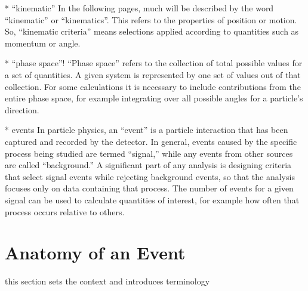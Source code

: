    * ``kinematic'' 
In the following pages, much will be described by the word 
``kinematic'' or ``kinematics''.  
This refers to the properties of position or motion.  
So, ``kinematic criteria'' means selections applied according to 
quantities such as momentum or angle.  




   * ``phase space''! 
``Phase space'' refers to the collection of total 
possible values for a set of quantities.  
A given system is represented by one set of 
values out of that collection.  
For some calculations it is necessary to include 
contributions from the entire phase space, 
for example integrating over all possible 
angles for a particle's direction.  

   * events
In particle physics, an ``event'' is a particle interaction 
that has been captured and recorded by the detector.  
In general, %
events caused by the specific process     
being studied are termed ``signal,'' 
while any events 
from other sources 
are called ``background.'' 
A significant part of any analysis is designing 
criteria that select signal events while 
rejecting background events, 
so that the analysis focuses only on data containing 
that process.  
The number of events for a given signal can be used 
to calculate quantities of interest, 
for example how often that process  
occurs relative to others.  

\section{Anatomy of an Event}

this section sets the context and introduces 
terminology

